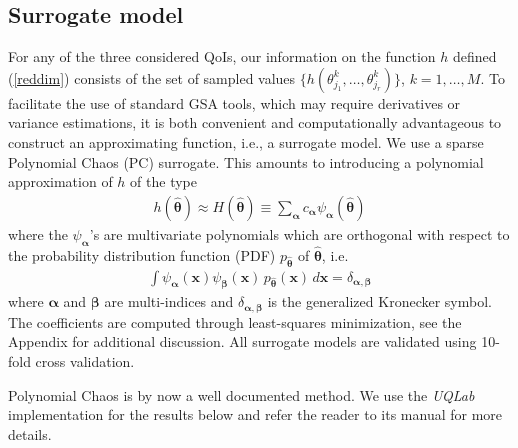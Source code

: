 \documentclass[smallextended]{svjour3}
\numberwithin{equation}{section}
\begin{document}
\subsection{Surrogate model}
\label{sec:surrogate}
For any of the three considered QoIs, our information on the function $h$ defined (\ref{reddim}) consists of the set of sampled values $\{ h(\theta_{j_1}^k, \dots, \theta_{j_r}^k)\}$, $k=1, \dots, M$.  To facilitate the use of standard GSA tools, which may require derivatives or variance estimations, it is both convenient and computationally advantageous to construct an approximating function, i.e., a surrogate model. 
We use a sparse Polynomial Chaos (PC) surrogate. This amounts to introducing a polynomial approximation of $h$ of the type
\begin{eqnarray}
h(\hat{\boldsymbol{\theta}}) \approx H(\hat{\boldsymbol{\theta}}) \equiv \sum_{\boldsymbol{\alpha}} c_{\boldsymbol{\alpha}} \psi_{\boldsymbol{\alpha}}(\hat{\boldsymbol{\theta}}) \label{pce}
\end{eqnarray}
where the $\psi_{\boldsymbol{\alpha}}$'s are multivariate polynomials which are orthogonal with respect to the probability distribution function (PDF) $p_{\hat{\boldsymbol{\theta}}}$ of $\hat{\boldsymbol{\theta}}$, i.e.
\begin{eqnarray}
\int \psi_{\boldsymbol{\alpha}}(\mathbf x) \psi_{\boldsymbol{\beta}}(\mathbf x)\, p_{\hat{\boldsymbol{\theta}}}(\mathbf x) \, d\mathbf{x} = \delta _{\boldsymbol{\alpha},\boldsymbol{\beta}} \label{ortho}
\end{eqnarray}
where $\boldsymbol{\alpha}$ and $\boldsymbol{\beta}$ are multi-indices and $\delta _{\boldsymbol{\alpha},\boldsymbol{\beta}}$ is the generalized Kronecker symbol. The coefficients are computed through least-squares minimization, see the Appendix for additional discussion. All surrogate models are validated using 10-fold cross validation.

Polynomial Chaos is by now a well documented method. We use the \textit{UQLab} implementation for the results below and refer the reader to its manual \cite{uqlab} for more details.
\end{document}
